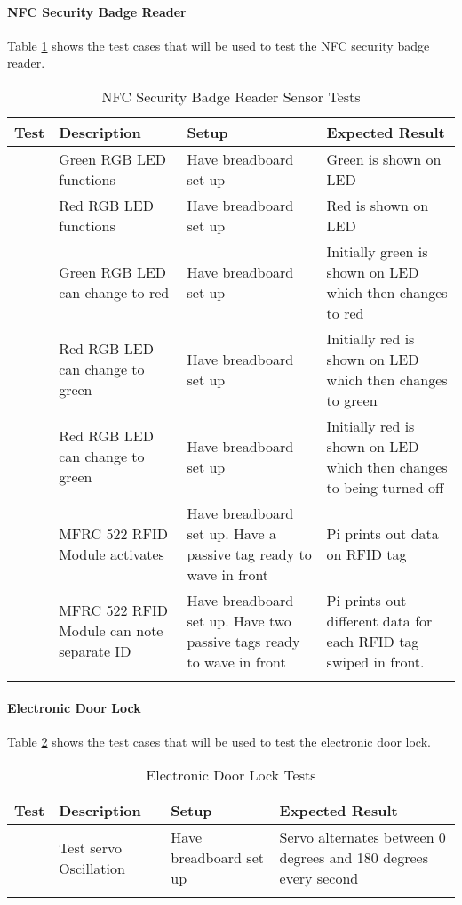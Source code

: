 \paragraph{NFC Security Badge Reader}

Table \ref{table:nfc-tests} shows the test cases that will be used to test the
NFC security badge reader.

\begin{longtable}[htb]{>{\centering\arraybackslash}m{0.75cm}|>{\centering\arraybackslash}m{4cm}|>{\centering\arraybackslash}m{4.5cm}|>{\centering\arraybackslash}m{4cm}}
\toprule
Test & Description & Setup & Expected Result \\
\midrule
1 & Green RGB LED functions & Have breadboard set up & Green is shown on LED \\
\hline
2 & Red RGB LED functions & Have breadboard set up & Red is shown on LED \\
\hline
3 & Green RGB LED can change to red & Have breadboard set up & Initially green
is shown on LED which then changes to red \\
\hline
4 & Red RGB LED can change to green & Have breadboard set up & Initially red is
shown on LED which then changes to green \\
\hline
5 & Red RGB LED can change to green & Have breadboard set up & Initially red is
shown on LED which then changes to being turned off \\
\hline
6 & MFRC 522 RFID Module activates & Have breadboard set up. Have a passive tag
ready to wave in front & Pi prints out data on RFID tag \\
\hline
7 & MFRC 522 RFID Module can note separate ID & Have breadboard set up. Have two
passive tags ready to wave in front & Pi prints out different data for each RFID
tag swiped in front. \\

\bottomrule
\caption{NFC Security Badge Reader Sensor Tests}
\label{table:nfc-tests}
\end{longtable}

\paragraph{Electronic Door Lock}

Table \ref{table:servo-tests} shows the test cases that will be used to test the
electronic door lock.

\begin{longtable}[htb]{>{\centering\arraybackslash}m{0.75cm}|>{\centering\arraybackslash}m{4cm}|>{\centering\arraybackslash}m{4.5cm}|>{\centering\arraybackslash}m{4cm}}
\toprule
Test & Description & Setup & Expected Result \\
\midrule
1 & Test servo Oscillation & Have breadboard set up & Servo alternates between
0 degrees and 180 degrees every second \\
\bottomrule
\caption{Electronic Door Lock Tests}
\label{table:servo-tests}
\end{longtable}

